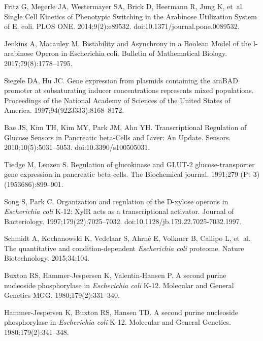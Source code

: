 \documentclass[10pt,letterpaper]{article}
\begin{document}
\begin{thebibliography}{10}
		Fritz G, Megerle JA, Westermayer SA, Brick D, Heermann R, Jung K, et~al.
		\newblock Single Cell Kinetics of Phenotypic Switching in the Arabinose
		Utilization System of E. coli.
		\newblock PLOS ONE. 2014;9(2):e89532.
		\newblock doi:{10.1371/journal.pone.0089532}.
		
		Jenkins A, Macauley M.
		\newblock Bistability and Asynchrony in a Boolean Model of the l-arabinose
		Operon in Escherichia coli.
		\newblock Bulletin of Mathematical Biology. 2017;79(8):1778--1795.
		
		Siegele DA, Hu JC.
		\newblock Gene expression from plasmids containing the araBAD promoter at
		subsaturating inducer concentrations represents mixed populations.
		\newblock Proceedings of the National Academy of Sciences of the United States
		of America. 1997;94(9223333):8168--8172.
		
		Bae JS, Kim TH, Kim MY, Park JM, Ahn YH.
		\newblock Transcriptional Regulation of Glucose Sensors in Pancreatic
		beta-Cells and Liver: An Update.
		\newblock Sensors. 2010;10(5):5031–5053.
		\newblock doi:{10.3390/s100505031}.
		
		Tiedge M, Lenzen S.
		\newblock Regulation of glucokinase and GLUT-2 glucose-transporter gene
		expression in pancreatic beta-cells.
		\newblock The Biochemical journal. 1991;279 (Pt 3)(1953686):899--901.
		
		Song S, Park C.
		\newblock Organization and regulation of the D-xylose operons in \emph{Escherichia
		coli} K-12: XylR acts as a transcriptional activator.
		\newblock Journal of Bacteriology. 1997;179(22):7025--7032.
		\newblock doi:{10.1128/jb.179.22.7025-7032.1997}.
		
		Schmidt A, Kochanowski K, Vedelaar S, Ahrné E, Volkmer B, Callipo L, et~al.
		\newblock The quantitative and condition-dependent \emph{Escherichia coli} proteome.
		\newblock Nature Biotechnology. 2015;34:104.
		
		Buxton RS, Hammer-Jespersen K, Valentin-Hansen P.
		\newblock A second purine nucleoside phosphorylase in \emph{Escherichia coli}
		K-12.
		\newblock Molecular and General Genetics MGG. 1980;179(2):331--340.
		
		Hammer-Jespersen K, Buxton RS, Hansen TD.
		\newblock A second purine nucleoside phosphorylase in \emph{Escherichia coli}
		K-12.
		\newblock Molecular and General Genetics. 1980;179(2):341--348.
		

\end{thebibliography}
\end{document}
